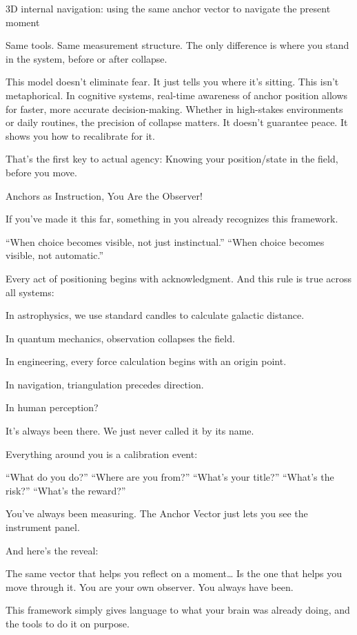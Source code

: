 \documentclass[12pt]{article}
\begin{document}
3D internal navigation: using the same anchor vector to navigate the present moment

Same tools.
Same measurement structure.
The only difference is where you stand in the system, before or after collapse.

This model doesn’t eliminate fear. It just tells you where it’s sitting. This isn’t metaphorical. In cognitive systems, real-time awareness of anchor position allows for faster, more accurate decision-making. Whether in high-stakes environments or daily routines, the precision of collapse matters. It doesn’t guarantee peace. It shows you how to recalibrate for it.

That’s the first key to actual agency:
Knowing your position/state in the field, before you move. 

Anchors as Instruction, You Are the Observer!

If you’ve made it this far, something in you already recognizes this framework.

“When choice becomes visible, not just instinctual.” 
“When choice becomes visible, not automatic.”

Every act of positioning begins with acknowledgment. And this rule is true across all systems:

In astrophysics, we use standard candles to calculate galactic distance.

In quantum mechanics, observation collapses the field.

In engineering, every force calculation begins with an origin point.

In navigation, triangulation precedes direction.

In human perception?

It’s always been there.
We just never called it by its name.

Everything around you is a calibration event:

“What do you do?”
“Where are you from?”
“What’s your title?”
“What’s the risk?”
“What’s the reward?”

You’ve always been measuring.
The Anchor Vector just lets you see the instrument panel.

And here’s the reveal:

The same vector that helps you reflect on a moment…
Is the one that helps you move through it.
You are your own observer.
You always have been.

This framework simply gives language to what your brain was already doing, and the tools to do it on purpose.
\end{document}
